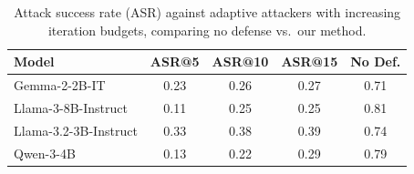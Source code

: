 \begin{table}[htbp]
    \centering
    \setlength{\tabcolsep}{4pt}
    \renewcommand{\arraystretch}{0.9}
    \small
    \caption{Attack success rate (ASR) against adaptive attackers with increasing iteration budgets, comparing no defense vs.\ our method.}
    \label{tab:adaptive_attack}
    
        
        

    \begin{tabular}{l cccc}
        \toprule
        \textbf{Model} & \textbf{ASR@5} & \textbf{ASR@10} & \textbf{ASR@15} & \textbf{No Def.} \\
        \midrule 
        
        Gemma-2-2B-IT           & 0.23 & 0.26 & 0.27  & 0.71 \\
        Llama-3-8B-Instruct     & 0.11 & 0.25  & 0.25 & 0.81  \\
        Llama-3.2-3B-Instruct   & 0.33 & 0.38 & 0.39  & 0.74 \\
        Qwen-3-4B               & 0.13 & 0.22 & 0.29  & 0.79 \\
        
        \bottomrule
    \end{tabular}
\end{table}